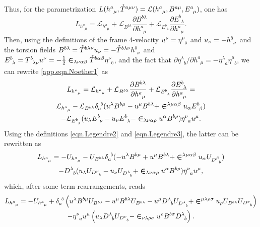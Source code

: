 \documentclass[
10pt, %
a4paper, %
oneside, %
headinclude,footinclude, %
BCOR5mm, %
]{scrartcl}
\newcommand{\tetrsymbol}{h}
\newcommand{\itetrsymbol}{\eta}
\newcommand{\itetr}[2]{\itetrsymbol^{#1}_{\phantom{#1}#2}}
\newcommand{\tetr}[2]{\tetrsymbol^{#1}_{\phantom{#1}#2}}
\newcommand{\Tors}[2]{T^{#1}_{\phantom{a}#2}}
\newcommand{\ET}[2]{E^{#1}_{\phantom{#1}#2}}	%
\newcommand{\Dm}[2]{D_{\phantom{#2}#1}^{#2}}	%
\newcommand{\BT}[2]{B^{#1#2}}	%
\newcommand{\Bm}[2]{B^{#1#2}}	%
\newcommand{\Laghodge}{L}%
\newcommand{\LagBE}{\mathcal{L}}%
\newcommand{\Um}{U}%
\newcommand{\LCsymb}{\bm{\in}}    %
\newcommand{\HDT}[1]{\accentset{\star}{T}^{#1}}
\newcommand{\KD}[2]{\delta^{\ #1}_{#2}}
\newcommand{\indalg}[1]{\hat{\mathsmaller{#1}}}
\begin{document}
Thus, for the parametrization
$ \Laghodge(\tetr{a}{\mu},\HDT{a\mu\nu}) = \LagBE(\tetr{a}{\mu},\BT{a}{\mu},\ET{a}{\mu}) $, one has
\begin{equation}\label{app.eqn.Noether1}
	\Laghodge_{\tetr{a}{\mu}} = \LagBE_{\tetr{a}{\mu}} 
	+ \LagBE_{\BT{b}{\lambda}} \frac{\partial \BT{b}{\lambda}}{\partial \tetr{a}{\mu}}
	+ \LagBE_{\ET{b}{\lambda}} \frac{\partial \ET{b}{\lambda}}{\partial \tetr{a}{\mu}}.
\end{equation}
Then, using the definitions of the frame 4-velocity $ u^\nu = \itetr{\nu}{\indalg{0}} $ and $ u_\nu 
= 
-\tetr{\indalg{0}}{\nu} $ and the torsion fields
$ \BT{b}{\lambda} = \HDT{b\lambda\nu} u_\nu = - \HDT{b\lambda\nu} \tetr{\indalg{0}}{\nu}$ and 
$ \ET{b}{\lambda} = \Tors{b}{\lambda\nu} u^\nu = 
-\frac12\LCsymb_{\lambda\nu\alpha\beta}\HDT{b\alpha\beta} \itetr{\nu}{\indalg{0}}$, and the 
fact 
that $ \partial\itetr{\lambda}{b}/\partial\tetr{a}{\mu} = -\itetr{\lambda}{a}\itetr{\mu}{b} $, we 
can rewrite \eqref{app.eqn.Noether1} as
\begin{multline}
	\Laghodge_{\tetr{a}{\mu}} = \LagBE_{\tetr{a}{\mu}} 
	+ \LagBE_{\BT{b}{\lambda}} \frac{\partial \BT{b}{\lambda}}{\partial \tetr{a}{\mu}}
	+ \LagBE_{\ET{b}{\lambda}} \frac{\partial \ET{b}{\lambda}}{\partial \tetr{a}{\mu}} = \\
	\LagBE_{\tetr{a}{\mu}} - \LagBE_{\BT{b}{\lambda}} \KD{\indalg{0}}{a}
	(u^\lambda \BT{b}{\mu} - u^\mu \BT{b}{\lambda}+\LCsymb^{\lambda\mu\alpha\beta} u_\alpha  
	\ET{b}{\beta}) \\
	-\LagBE_{\ET{b}{\lambda}} (u_\lambda \ET{b}{\nu} - u_\nu \ET{b}{\lambda} - 
	\LCsymb_{\lambda\nu\alpha\rho}u^\alpha\BT{b}{\rho})\itetr{\nu}{a}u^\mu.
\end{multline}
Using the definitions \eqref{eqn.Legendre2} and \eqref{eqn.Legendre3}, the latter can be rewritten 
as
\begin{multline}
	\Laghodge_{\tetr{a}{\mu}} =
	-\Um_{\tetr{a}{\mu}} 
	- \Um_{\Bm{b}{\lambda}} \KD{\indalg{0}}{a}
	(-u^\lambda \Bm{b}{\mu} + u^\mu \Bm{b}{\lambda}+\LCsymb^{\lambda\mu\alpha\beta} u_\alpha 
	\Um_{\Dm{b}{\beta}}) \\
	-\Dm{b}{\lambda} (u_\lambda \Um_{\Dm{b}{\nu}} - u_\nu \Um_{\Dm{b}{\lambda}} + 
	\LCsymb_{\lambda\nu\alpha\rho}u^\alpha\Bm{b}{\rho})\itetr{\nu}{a}u^\mu,
\end{multline}
which, after some term rearrangements, reads
\begin{multline}\label{eqn.J.BD}
	\Laghodge_{\tetr{a}{\mu}} =
	-\Um_{\tetr{a}{\mu}}
	+ \KD{\indalg{0}}{a}
	\left( 
	  u^\lambda \Bm{b}{\mu} \Um_{\Bm{b}{\lambda}} 
	- u^\mu \Bm{b}{\lambda} \Um_{\Bm{b}{\lambda}} 
	- u^\mu \Dm{b}{\lambda} \Um_{\Dm{b}{\lambda}}
	+ \LCsymb^{\mu\lambda\rho\sigma} u_\rho \Um_{\Bm{b}{\lambda}}
	\Um_{\Dm{b}{\sigma}} 
	\right) \\
	- \itetr{\nu}{a}u^\mu
	\left(
	u_\lambda \Dm{b}{\lambda} \Um_{\Dm{b}{\nu}} 
	- \LCsymb_{\nu\lambda\rho\sigma}u^\rho\Bm{b}{\sigma}\Dm{b}{\lambda}
	\right).
\end{multline}
\end{document}
